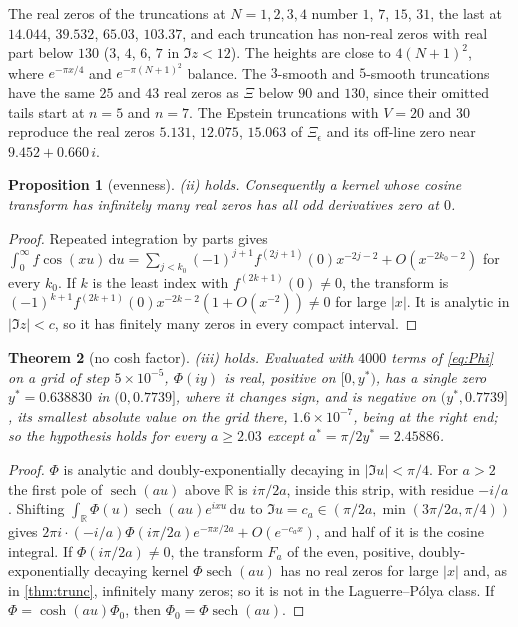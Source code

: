\documentclass[11pt]{article}
\newtheorem{theorem}{Theorem}[section]
\newtheorem{proposition}[theorem]{Proposition}
\theoremstyle{definition}\newtheorem{definition}[theorem]{Definition}
\theoremstyle{remark}\newtheorem{remark}[theorem]{Remark}
\newcommand{\R}{\mathbb R}\newcommand{\C}{\mathbb C}\newcommand{\N}{\mathbb N}
\newcommand{\dd}{\,\mathrm d}\newcommand{\e}{\mathrm e}
\begin{document}
The real zeros of the truncations at $N=1,2,3,4$ number $1$, $7$, $15$, $31$, the last at $14.044$, $39.532$, $65.03$, $103.37$, and each truncation has non-real zeros with real part below $130$ ($3$, $4$, $6$, $7$ in $\Im z<12$). The heights are close to $4(N+1)^2$, where $e^{-\pi x/4}$ and $e^{-\pi(N+1)^2}$ balance. The $3$-smooth and $5$-smooth truncations have the same $25$ and $43$ real zeros as $\Xi$ below $90$ and $130$, since their omitted tails start at $n=5$ and $n=7$. The Epstein truncations with $V=20$ and $30$ reproduce the real zeros $5.131$, $12.075$, $15.063$ of $\Xi_\epsilon$ and its off-line zero near $9.452+0.660\,i$.

\begin{proposition}[evenness]\label{prop:even}
(ii) holds. Consequently a kernel whose cosine transform has infinitely many real zeros has all odd derivatives zero at $0$.
\end{proposition}
\begin{proof}
Repeated integration by parts gives $\int_0^\infty f\cos(xu)\dd u=\sum_{j<k_0}(-1)^{j+1}f^{(2j+1)}(0)x^{-2j-2}+O(x^{-2k_0-2})$ for every $k_0$. If $k$ is the least index with $f^{(2k+1)}(0)\ne0$, the transform is $(-1)^{k+1}f^{(2k+1)}(0)x^{-2k-2}(1+O(x^{-2}))\ne0$ for large $|x|$. It is analytic in $|\Im z|<c$, so it has finitely many zeros in every compact interval.
\end{proof}

\begin{theorem}[no cosh factor]\label{thm:cosh}
(iii) holds. Evaluated with $4000$ terms of \eqref{eq:Phi} on a grid of step $5\times10^{-5}$, $\Phi(iy)$ is real, positive on $[0,y^*)$, has a single zero $y^*=0.638830$ in $(0,0.7739]$, where it changes sign, and is negative on $(y^*,0.7739]$, its smallest absolute value on the grid there, $1.6\times10^{-7}$, being at the right end; so the hypothesis holds for every $a\ge2.03$ except $a^*=\pi/2y^*=2.45886$.
\end{theorem}
\begin{proof}
$\Phi$ is analytic and doubly-exponentially decaying in $|\Im u|<\pi/4$. For $a>2$ the first pole of $\operatorname{sech}(au)$ above $\R$ is $i\pi/2a$, inside this strip, with residue $-i/a$. Shifting $\int_\R\Phi(u)\operatorname{sech}(au)e^{ixu}\dd u$ to $\Im u=c_a\in(\pi/2a,\min(3\pi/2a,\pi/4))$ gives $2\pi i\cdot(-i/a)\Phi(i\pi/2a)e^{-\pi x/2a}+O(e^{-c_ax})$, and half of it is the cosine integral. If $\Phi(i\pi/2a)\ne0$, the transform $F_a$ of the even, positive, doubly-exponentially decaying kernel $\Phi\operatorname{sech}(au)$ has no real zeros for large $|x|$ and, as in \cref{thm:trunc}, infinitely many zeros; so it is not in the Laguerre--P\'olya class. If $\Phi=\cosh(au)\Phi_0$, then $\Phi_0=\Phi\operatorname{sech}(au)$.
\end{proof}
\end{document}
